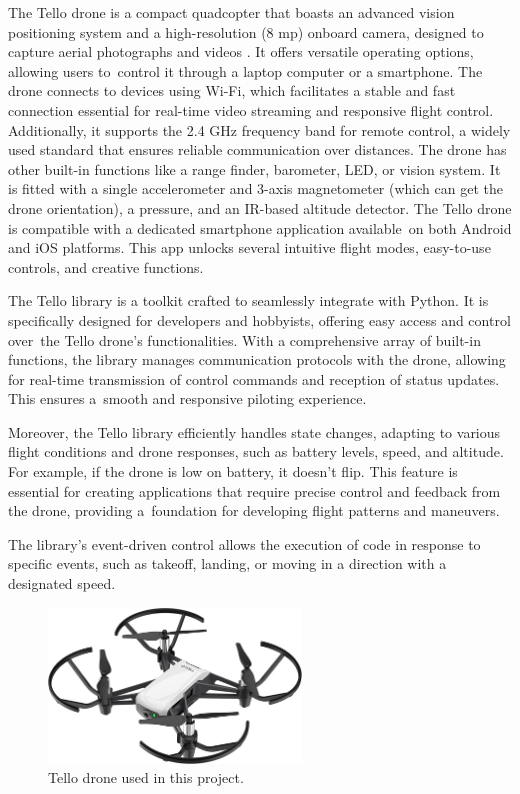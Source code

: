 The Tello drone is a compact quadcopter that boasts an advanced vision positioning system and a high-resolution (8 mp) onboard camera, designed to capture aerial photographs and videos \cite{tello2023specs}.
 It offers versatile operating options, allowing users to~control it through a laptop computer or a smartphone. The drone connects to devices using Wi-Fi, which facilitates a stable and fast connection essential for real-time video streaming and responsive flight control. Additionally, it supports the 2.4 GHz frequency band for remote control, a widely used standard that ensures reliable communication over distances. The drone has other built-in functions like a range finder, barometer, LED, or vision system. It is fitted with a single accelerometer and 3-axis magnetometer (which can get the drone orientation), a pressure, and an IR-based altitude detector. The Tello drone is compatible with a dedicated smartphone application available~on both Android and iOS platforms. This app unlocks several intuitive flight modes, easy-to-use controls, and creative functions.

The Tello library is a toolkit crafted to seamlessly integrate with Python. It is specifically designed for developers and hobbyists, offering easy access and control over~the Tello drone's functionalities. With a comprehensive array of built-in functions, the library manages communication protocols with the drone, allowing for real-time transmission of control commands and reception of status updates. This ensures a~smooth and responsive piloting experience.

Moreover, the Tello library efficiently handles state changes, adapting to various flight conditions and drone responses, such as battery levels, speed, and altitude. For example, if the drone is low on battery, it doesn't flip. This feature is essential for creating applications that require precise control and feedback from the drone, providing a~foundation for developing flight patterns and maneuvers.

The library's event-driven control allows the execution of code in response to specific events, such as takeoff, landing, or moving in a direction with a designated speed.

\begin{figure}[h!]
	\centering
	\includegraphics[width = 0.6\textwidth]{images/drone.jpg}
	\caption{Tello drone used in this project.}
	\label{fig:tello}
\end{figure}

